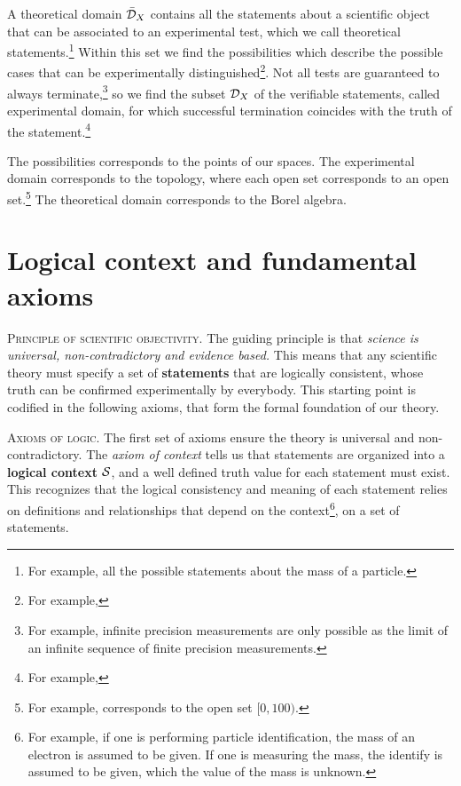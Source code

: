 \documentclass[10pt,twocolumn, nofootinbib]{revtex4-1}
\newcommand\partitle[1]{\textsc{#1}.}
\begin{document}
A theoretical domain $\bar{\mathcal{D}}_X$ contains all the statements about a scientific object that can be associated to an experimental test, which we call theoretical statements.\footnote{For example, all the possible statements about the mass of a particle.} Within this set we find the possibilities which describe the possible cases that can be experimentally distinguished\footnote{For example, }. Not all tests are guaranteed to always terminate,\footnote{For example, infinite precision measurements are only possible as the limit of an infinite sequence of finite precision measurements.} so we find the subset $\mathcal{D}_X$ of the verifiable statements, called experimental domain, for which successful termination coincides with the truth of the statement.\footnote{For example, }

The possibilities corresponds to the points of our spaces. The experimental domain corresponds to the topology, where each open set corresponds to an open set.\footnote{For example,  corresponds to the open set $[0, 100)$.} The theoretical domain corresponds to the Borel algebra.


\section{Logical context and fundamental axioms}

\partitle{Principle of scientific objectivity} The guiding principle is that \emph{science is universal, non-contradictory and evidence based.} This means that any scientific theory must specify a set of \textbf{statements} that are logically consistent, whose truth can be confirmed experimentally by everybody. This starting point is codified in the following axioms, that form the formal foundation of our theory.

\partitle{Axioms of logic} The first set of axioms ensure the theory is universal and non-contradictory. The \emph{axiom of context} tells us that statements are organized into a \textbf{logical context} $\mathcal{S}$, and a well defined truth value for each statement must exist. This recognizes that the logical consistency and meaning of each statement relies on definitions and relationships that depend on the context\footnote{For example, if one is performing particle identification, the mass of an electron is assumed to be given. If one is measuring the mass, the identify is assumed to be given, which the value of the mass is unknown.}, on a set of statements.
\end{document}
